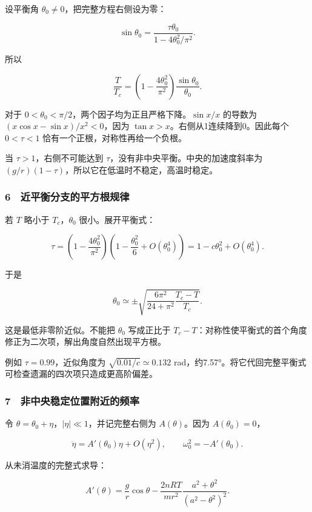 \documentclass[12pt,a4paper,fontset=fandol]{ctexart}
\begin{document}
设平衡角 \(\theta_0\ne0\)，把完整方程右侧设为零：

\[\sin\theta_0=\frac{\tau\theta_0}{1-4\theta_0^2/\pi^2}.\]

所以

\[\boxed{\frac T{T_c}
=\left(1-\frac{4\theta_0^2}{\pi^2}\right)
\frac{\sin\theta_0}{\theta_0}.}\]

对于 \(0<\theta_0<\pi/2\)，两个因子均为正且严格下降。\(\sin x/x\)
的导数为 \((x\cos x-\sin x)/x^2<0\)，因为
\(\tan x>x\)。右侧从1连续降到0。因此每个 \(0<\tau<1\)
恰有一个正根，对称性再给一个负根。

当 \(\tau>1\)，右侧不可能达到
\(\tau\)，没有非中央平衡。中央的加速度斜率为
\((g/r)(1-\tau)\)，所以它在低温时不稳定，高温时稳定。

\subsubsection{6　近平衡分支的平方根规律}\label{ux8fd1ux5e73ux8861ux5206ux652fux7684ux5e73ux65b9ux6839ux89c4ux5f8b}

若 \(T\) 略小于 \(T_c\)，\(\theta_0\) 很小。展开平衡式：

\[\tau=\left(1-\frac{4\theta_0^2}{\pi^2}\right)
\left(1-\frac{\theta_0^2}{6}+O(\theta_0^4)\right)
=1-c\theta_0^2+O(\theta_0^4).\]

于是

\[\boxed{\theta_0\simeq\pm
\sqrt{\frac{6\pi^2}{24+\pi^2}\frac{T_c-T}{T_c}}.}\]

这是最低非零阶近似。不能把 \(\theta_0\) 写成正比于
\(T_c-T\)：对称性使平衡式的首个角度修正为二次项，解出角度自然出现平方根。

例如 \(\tau=0.99\)，近似角度为 \(\sqrt{0.01/c}\simeq0.132\)
rad，约7.57°。将它代回完整平衡式可检查遗漏的四次项只造成更高阶偏差。

\subsubsection{7　非中央稳定位置附近的频率}\label{ux975eux4e2dux592eux7a33ux5b9aux4f4dux7f6eux9644ux8fd1ux7684ux9891ux7387}

令 \(\theta=\theta_0+\eta\)，\(|\eta|\ll1\)，并记完整右侧为
\(A(\theta)\)。因为 \(A(\theta_0)=0\)，

\[\ddot\eta=A'(\theta_0)\eta+O(\eta^2),\qquad
\omega_0^2=-A'(\theta_0).\]

从未消温度的完整式求导：

\[A'(\theta)=\frac gr\cos\theta
-\frac{2nRT}{mr^2}\frac{a^2+\theta^2}{(a^2-\theta^2)^2}.\]
\end{document}
